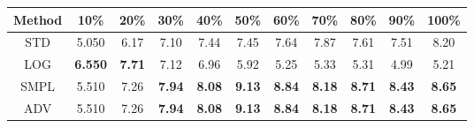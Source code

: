 \documentclass{standalone}
\begin{document}
\begin{tabular}{c|cccccccccc}
      \toprule
      Method & 10\% & 20\% & 30\% & 40\% & 50\% & 60\% & 70\% & 80\% & 90\% & 100\% \\
      \midrule
STD & 5.050 & 6.17 & 7.10 & 7.44 & 7.45 & 7.64 & 7.87 & 7.61 & 7.51 & 8.20\\
LOG & \textbf{6.550} & \textbf{7.71} & 7.12 & 6.96 & 5.92 & 5.25 & 5.33 & 5.31 & 4.99 & 5.21\\
SMPL & 5.510 & 7.26 & \textbf{7.94} & \textbf{8.08} & \textbf{9.13} & \textbf{8.84} & \textbf{8.18} & \textbf{8.71} & \textbf{8.43} & \textbf{8.65}\\
ADV & 5.510 & 7.26 & \textbf{7.94} & \textbf{8.08} & \textbf{9.13} & \textbf{8.84} & \textbf{8.18} & \textbf{8.71} & \textbf{8.43} & \textbf{8.65}\\
  \bottomrule
\end{tabular}
\end{document}
